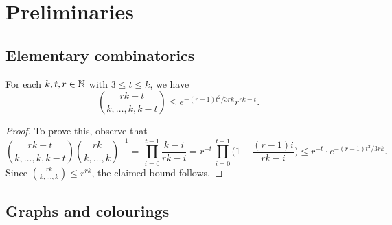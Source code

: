 
\section{Preliminaries}


\subsection{Elementary combinatorics}


\begin{lemma}
  \label{lem:multibounds} %
  For each $k,t,r \in \mathbb{N}$ with $3 \le t \le k$, we have
  $$\binom{rk-t}{k,\dots,k,k-t} \le e^{-(r-1)t^2/3rk} r^{rk-t}.$$
\end{lemma}
%
\begin{proof}
  To prove this, observe that 
  $$\binom{rk-t}{k,\dots,k,k-t} \binom{rk}{k,\dots,k}^{-1} = \, \prod_{i = 0}^{t - 1} \frac{k - i}{rk - i} = r^{-t} \,\prod_{i = 0}^{t-1} \bigg( 1 - \frac{(r-1)i}{rk - i} \bigg) \le r^{-t} \cdot e^{-(r-1)t^2/3rk}.$$
  Since $\binom{rk}{k,\dots,k} \le r^{rk}$, the claimed bound follows.
\end{proof}


\subsection{Graphs and colourings}


